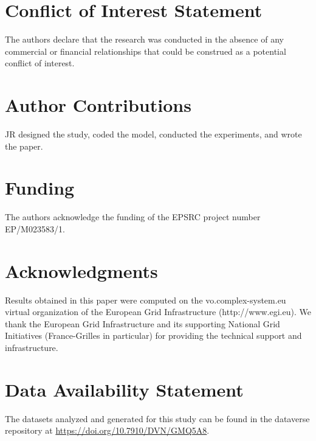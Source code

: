 \documentclass[utf8]{frontiersFPHY} %
\begin{document}
\section*{Conflict of Interest Statement}

The authors declare that the research was conducted in the absence of any commercial or financial relationships that could be construed as a potential conflict of interest.

\section*{Author Contributions}

JR designed the study, coded the model, conducted the experiments, and wrote the paper.

\section*{Funding}

The authors acknowledge the funding of the EPSRC project number EP/M023583/1.

\section*{Acknowledgments}

Results obtained in this paper were computed on the vo.complex-system.eu virtual organization of the European Grid Infrastructure (http://www.egi.eu). We thank the European Grid Infrastructure and its supporting National Grid Initiatives (France-Grilles in particular) for providing the technical support and infrastructure.



\section*{Data Availability Statement}

The datasets analyzed and generated for this study can be found in the dataverse repository at \url{https://doi.org/10.7910/DVN/GMQ5A8}.
\end{document}

